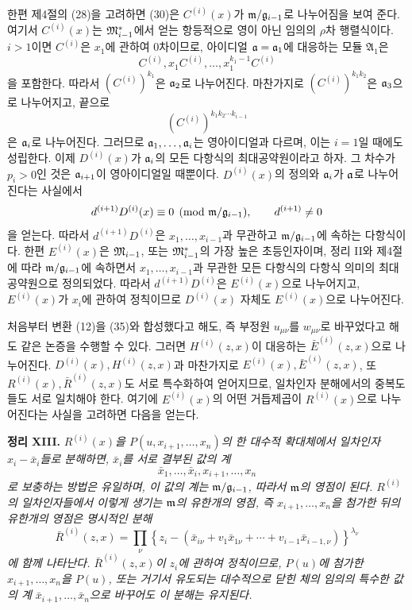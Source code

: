 한편 제4절의 (28)을 고려하면 (30)은 \(C^{(i)}(x)\)가 \(\mathfrak m/\mathfrak g_{i-1}\)로 나누어짐을 보여 준다. 여기서 \(C^{(i)}(x)\)는 \(\mathfrak M^*_{i-1}\)에서 얻는 항등적으로 영이 아닌 임의의 \(\rho\)차 행렬식이다. \(i>1\)이면 \(C^{(i)}\)은 \(x_1\)에 관하여 0차이므로, 아이디얼 \(\mathfrak a=\mathfrak a_1\)에 대응하는 모듈 \(\mathfrak A_1\)은
\[
C^{(i)},x_1C^{(i)},\ldots,x_1^{k_1-1}C^{(i)}
\]
을 포함한다. 따라서 \((C^{(i)})^{k_1}\)은 \(\mathfrak a_2\)로 나누어진다. 마찬가지로 \((C^{(i)})^{k_1k_2}\)은 \(\mathfrak a_3\)으로 나누어지고, 끝으로
\[
(C^{(i)})^{k_1k_2\cdots k_{i-1}}
\]
은 \(\mathfrak a_i\)로 나누어진다. 그러므로 \(\mathfrak a_1,\ldots,\mathfrak a_i\)는 영아이디얼과 다르며, 이는 \(i=1\)일 때에도 성립한다. 이제 \(D^{(i)}(x)\)가 \(\mathfrak a_i\)의 모든 다항식의 최대공약원이라고 하자. 그 차수가 \(p_i>0\)인 것은 \(\mathfrak a_{i+1}\)이 영아이디얼일 때뿐이다. \(D^{(i)}(x)\)의 정의와 \(\mathfrak a_i\)가 \(\mathfrak a\)로 나누어진다는 사실에서
\[
d^{(i+1)}D^{(i)}(x)\equiv0\pmod{\mathfrak m/\mathfrak g_{i-1}},
\qquad d^{(i+1)}\ne0
\]
을 얻는다. 따라서 \(d^{(i+1)}D^{(i)}\)은 \(x_1,\ldots,x_{i-1}\)과 무관하고 \(\mathfrak m/\mathfrak g_{i-1}\)에 속하는 다항식이다. 한편 \(E^{(i)}(x)\)은 \(\mathfrak M_{i-1}\), 또는 \(\mathfrak M^*_{i-1}\)의 가장 높은 초등인자이며, 정리 II와 제4절에 따라 \(\mathfrak m/\mathfrak g_{i-1}\)에 속하면서 \(x_1,\ldots,x_{i-1}\)과 무관한 모든 다항식의 다항식 의미의 최대공약원으로 정의되었다. 따라서 \(d^{(i+1)}D^{(i)}\)은 \(E^{(i)}(x)\)으로 나누어지고, \(E^{(i)}(x)\)가 \(x_i\)에 관하여 정칙이므로 \(D^{(i)}(x)\) 자체도 \(E^{(i)}(x)\)으로 나누어진다.

처음부터 변환 (12)을 (35)와 합성했다고 해도, 즉 부정원 \(u_{\mu\nu}\)를 \(w_{\mu\nu}\)로 바꾸었다고 해도 같은 논증을 수행할 수 있다. 그러면 \(H^{(i)}(z,x)\)이 대응하는 \(\bar E^{(i)}(z,x)\)으로 나누어진다. \(D^{(i)}(x),H^{(i)}(z,x)\)과 마찬가지로 \(E^{(i)}(x),\bar E^{(i)}(z,x)\), 또 \(R^{(i)}(x),\bar R^{(i)}(z,x)\)도 서로 특수화하여 얻어지므로, 일차인자 분해에서의 중복도들도 서로 일치해야 한다. 여기에 \(E^{(i)}(x)\)의 어떤 거듭제곱이 \(R^{(i)}(x)\)으로 나누어진다는 사실을 고려하면 다음을 얻는다.

\medskip
\noindent\textbf{정리 XIII.} \emph{\(R^{(i)}(x)\)을 \(P(u,x_{i+1},\ldots,x_n)\)의 한 대수적 확대체에서 일차인자 \(x_i-\bar x_i\)들로 분해하면, \(\bar x_i\)를 서로 결부된 값의 계
\[
\bar x_1,\ldots,\bar x_i,x_{i+1},\ldots,x_n
\]
로 보충하는 방법은 유일하며, 이 값의 계는 \(\mathfrak m/\mathfrak g_{i-1}\), 따라서 \(\mathfrak m\)의 영점이 된다. \(R^{(i)}\)의 일차인자들에서 이렇게 생기는 \(\mathfrak m\)의 유한개의 영점, 즉 \(x_{i+1},\ldots,x_n\)을 첨가한 뒤의 유한개의 영점은 명시적인 분해
\begin{equation}
\bar R^{(i)}(z,x)=
\prod_\nu
\left\{z_i-(\bar x_{i\nu}+v_1\bar x_{1\nu}
+\cdots+v_{i-1}\bar x_{i-1,\nu})\right\}^{\lambda_\nu}
\tag{36}
\end{equation}
에 함께 나타난다. \(\bar R^{(i)}(z,x)\)이 \(z_i\)에 관하여 정칙이므로, \(P(u)\)에 첨가한 \(x_{i+1},\ldots,x_n\)을 \(P(u)\), 또는 거기서 유도되는 대수적으로 닫힌 체의 임의의 특수한 값의 계 \(\bar x_{i+1},\ldots,\bar x_n\)으로 바꾸어도 이 분해는 유지된다.}

